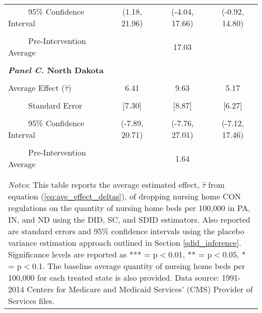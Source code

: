 \documentclass[../Main.tex]{subfiles}
\begin{document}
\begin{table}[htbp]
\begin{tabular}{l*{3}{c}}
\\[-2ex]
\multicolumn{1}{l}{\ \ \ \ \ 95\% Confidence Interval}&   \multicolumn{1}{c}{(1.18, 21.96)}&   \multicolumn{1}{c}{(-4.04, 17.66)}&   \multicolumn{1}{c}{(-0.92, 14.80)}\\
\\[-2ex]
\multicolumn{1}{l}{\ \ \ \ \ Pre-Intervention Average}&   \multicolumn{3}{c}{17.03}\\
\\[-.1ex]
\multicolumn{4}{l}{\textbf{\textit{Panel C.} North Dakota}}\\
\\[-1.5ex]
\multicolumn{1}{l}{Average Effect ($\hat{\tau}$)}&   \multicolumn{1}{c}{6.41}&   \multicolumn{1}{c}{9.63}&  \multicolumn{1}{c}{5.17}\\
\\[-2ex]
\multicolumn{1}{l}{\ \ \ \ \ Standard Error}  &\multicolumn{1}{c}{[7.30]}&\multicolumn{1}{c}{[8.87]}&\multicolumn{1}{c}{[6.27]}\\
\\[-2ex]
\multicolumn{1}{l}{\ \ \ \ \ 95\% Confidence Interval}&   \multicolumn{1}{c}{(-7.89, 20.71)}&   \multicolumn{1}{c}{(-7.76, 27.01)}&   \multicolumn{1}{c}{(-7.12, 17.46)}\\
\\[-2ex]
\multicolumn{1}{l}{\ \ \ \ \ Pre-Intervention Average}&   \multicolumn{3}{c}{1.64}\\
\\[-.1ex]
\hline\hline
\\[-2ex]
\multicolumn{4}{p{.75\linewidth}}{\footnotesize \textit{Notes}: This table reports the average estimated effect, $\hat{\tau}$ from equation (\ref{eq:ave_effect_deltas}), of dropping nursing home CON regulations on the quantity of nursing home beds per 100,000 in PA, IN, and ND using the DID, SC, and SDID estimators. Also reported are standard errors and 95\% confidence intervals using the placebo variance estimation approach outlined in Section \ref{sdid_inference}. Significance levels are reported as *** = p$<$0.01, ** = p$<$0.05, * = p$<$0.1. The baseline average quantity of nursing home beds per 100,000 for each treated state is also provided. Data source: 1991-2014 Centers for Medicare and Medicaid Services’ (CMS) Provider of Services files.}
\end{tabular}
\end{table}
\vfill
\clearpage
\end{document}
